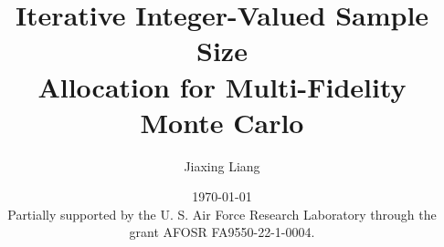 \documentclass{beamer}
\title[MFMC for Tokamak UQ]{Iterative Integer-Valued Sample Size \\Allocation for Multi-Fidelity Monte Carlo}
\date{\today\\[2em]
{\footnotesize Partially supported by the U. S. Air Force Research Laboratory through the grant AFOSR FA9550-22-1-0004. }
}
\author[J.Liang]{\normalsize  Jiaxing Liang\\ }
\institute[Rice University]{\fontsize{8}{8} Department of Computational Applied Mathematics \& Operations Research, Rice University}
\begin{document}
\frame{\titlepage }

\end{document}
